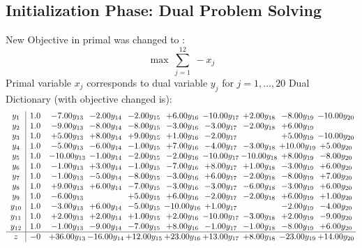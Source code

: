 \documentclass[8pt]{article}
\begin{document}
\subsection{Initialization Phase: Dual Problem Solving}
New Objective in primal was changed to : \[ \max\ \sum_{j=1}^{12}\ - x_j \] 
Primal variable $x_j$ corresponds to dual variable $y_j$ for $j = 1,\ldots,20$
Dual Dictionary (with objective changed is): 
\[\begin{array}{c| c c@{\hskip 2pt} c@{\hskip 2pt} c@{\hskip 2pt} c@{\hskip 2pt} c@{\hskip 2pt} c@{\hskip 2pt} c@{\hskip 2pt} c@{\hskip 2pt} }
 y_{1}   &  1.0 & -7.00 y_{13} & -2.00 y_{14} & -2.00 y_{15} & +  6.00 y_{16} & -10.00 y_{17} & +  2.00 y_{18} & -8.00 y_{19} & -10.00 y_{20}\\
 y_{2}   &  1.0 & -9.00 y_{13} & -8.00 y_{14} & -8.00 y_{15} & -3.00 y_{16} & -3.00 y_{17} & -2.00 y_{18} & +  6.00 y_{19} &   \\
 y_{3}   &  1.0 & +  5.00 y_{13} & +  8.00 y_{14} & +  9.00 y_{15} & +  1.00 y_{16} & -2.00 y_{17} &   & +  5.00 y_{19} & -10.00 y_{20}\\
 y_{4}   &  1.0 & -5.00 y_{13} & -6.00 y_{14} & -1.00 y_{15} & +  7.00 y_{16} & -4.00 y_{17} & -3.00 y_{18} & + 10.00 y_{19} & +  5.00 y_{20}\\
 y_{5}   &  1.0 & -10.00 y_{13} & -1.00 y_{14} & -2.00 y_{15} & -2.00 y_{16} & -10.00 y_{17} & -10.00 y_{18} & +  8.00 y_{19} & -8.00 y_{20}\\
 y_{6}   &  1.0 & -1.00 y_{13} & +  3.00 y_{14} & -1.00 y_{15} & -7.00 y_{16} & +  8.00 y_{17} & +  1.00 y_{18} & -3.00 y_{19} & +  6.00 y_{20}\\
 y_{7}   &  1.0 & -1.00 y_{13} & -5.00 y_{14} & -8.00 y_{15} & -3.00 y_{16} & +  6.00 y_{17} & -2.00 y_{18} & -8.00 y_{19} & +  7.00 y_{20}\\
 y_{8}   &  1.0 & +  9.00 y_{13} & +  6.00 y_{14} & -7.00 y_{15} & -3.00 y_{16} & -3.00 y_{17} & -6.00 y_{18} & -3.00 y_{19} & +  6.00 y_{20}\\
 y_{9}   &  1.0 & -6.00 y_{13} &   & +  5.00 y_{15} & +  6.00 y_{16} & -2.00 y_{17} & -2.00 y_{18} & +  6.00 y_{19} & +  1.00 y_{20}\\
 y_{10}   &  1.0 & -3.00 y_{13} & +  6.00 y_{14} & -5.00 y_{15} & -10.00 y_{16} & +  1.00 y_{17} &   & -2.00 y_{19} & -4.00 y_{20}\\
 y_{11}   &  1.0 & +  2.00 y_{13} & +  2.00 y_{14} & +  1.00 y_{15} & +  2.00 y_{16} & -10.00 y_{17} & -3.00 y_{18} & +  2.00 y_{19} & -9.00 y_{20}\\
 y_{12}   &  1.0 & -1.00 y_{13} & -9.00 y_{14} & -7.00 y_{15} & +  8.00 y_{16} & -1.00 y_{17} & -1.00 y_{18} & -8.00 y_{19} & +  6.00 y_{20}\\
\hline
z    &  -0 & + 36.00 y_{13} & -16.00 y_{14} & + 12.00 y_{15} & + 23.00 y_{16} & + 13.00 y_{17} & +  8.00 y_{18} & -23.00 y_{19} & + 14.00 y_{20}\\
\end{array}\]
\end{document}
